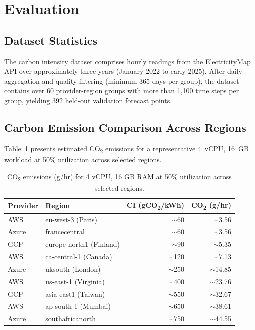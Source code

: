 \documentclass[12pt]{article}
\begin{document}
\section{Evaluation}

\subsection{Dataset Statistics}
The carbon intensity dataset comprises hourly readings from the ElectricityMap API over approximately three years (January 2022 to early 2025). After daily aggregation and quality filtering (minimum 365 days per group), the dataset contains over 60 provider-region groups with more than 1,100 time steps per group, yielding 392 held-out validation forecast points.

\subsection{Carbon Emission Comparison Across Regions}
Table~\ref{tab:carbon_comparison} presents estimated CO\textsubscript{2} emissions for a representative 4~vCPU, 16~GB workload at 50\% utilization across selected regions.

\begin{table}[!t]
\centering
\caption{CO\textsubscript{2} emissions (g/hr) for 4 vCPU, 16 GB RAM at 50\% utilization across selected regions.}
\label{tab:carbon_comparison}
\small
\begin{tabular}{llrr}
\toprule
\textbf{Provider} & \textbf{Region} & \textbf{CI (gCO\textsubscript{2}/kWh)} & \textbf{CO\textsubscript{2} (g/hr)} \\
\midrule
AWS & eu-west-3 (Paris) & $\sim$60 & $\sim$3.56 \\
Azure & francecentral & $\sim$60 & $\sim$3.56 \\
GCP & europe-north1 (Finland) & $\sim$90 & $\sim$5.35 \\
AWS & ca-central-1 (Canada) & $\sim$120 & $\sim$7.13 \\
Azure & uksouth (London) & $\sim$250 & $\sim$14.85 \\
AWS & us-east-1 (Virginia) & $\sim$400 & $\sim$23.76 \\
GCP & asia-east1 (Taiwan) & $\sim$550 & $\sim$32.67 \\
AWS & ap-south-1 (Mumbai) & $\sim$650 & $\sim$38.61 \\
Azure & southafricanorth & $\sim$750 & $\sim$44.55 \\
\bottomrule
\end{tabular}
\end{table}
\end{document}
